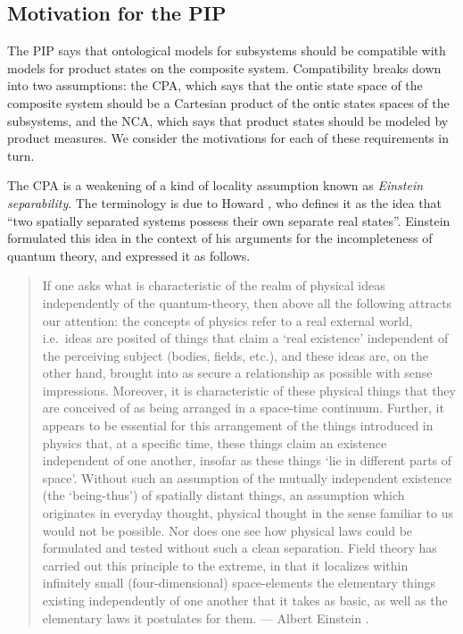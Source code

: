 \documentclass[DIV=calc,paper=a4,fontsize=11pt,twocolumn]{scrartcl} %
\theoremstyle{definition}
\theoremstyle{plain}
\begin{document}
\subsection{Motivation for the PIP}

\label{MPIP}

The PIP says that ontological models for subsystems should be
compatible with models for product states on the composite system.
Compatibility breaks down into two assumptions: the CPA, which says
that the ontic state space of the composite system should be a
Cartesian product of the ontic states spaces of the subsystems, and
the NCA, which says that product states should be modeled by product
measures.  We consider the motivations for each of these requirements
in turn.

The CPA is a weakening of a kind of locality assumption known as
\emph{Einstein separability}.  The terminology is due to Howard
\cite{Howard1985}, who defines it as the idea that ``two spatially
separated systems possess their own separate real states''.  Einstein
formulated this idea in the context of his arguments for the
incompleteness of quantum theory, and expressed it as follows.

\begin{quotation}
If one asks what is characteristic of the realm of physical ideas
independently of the quantum-theory, then above all the following
attracts our attention: the concepts of physics refer to a real
external world, i.e.\ ideas are posited of things that claim a `real
existence' independent of the perceiving subject (bodies, fields,
etc.), and these ideas are, on the other hand, brought into as
secure a relationship as possible with sense impressions.  Moreover,
it is characteristic of these physical things that they are
conceived of as being arranged in a space-time continuum.  Further,
it appears to be essential for this arrangement of the things
introduced in physics that, at a specific time, these things claim
an existence independent of one another, insofar as these things
`lie in different parts of space'.  Without such an assumption of
the mutually independent existence (the `being-thus') of spatially
distant things, an assumption which originates in everyday thought,
physical thought in the sense familiar to us would not be possible.
Nor does one see how physical laws could be formulated and tested
without such a clean separation.  Field theory has carried out this
principle to the extreme, in that it localizes within infinitely
small (four-dimensional) space-elements the elementary things
existing independently of one another that it takes as basic, as
well as the elementary laws it postulates for them.  --- Albert
Einstein \cite{Einstein1948}.
\end{quotation}
\end{document}
